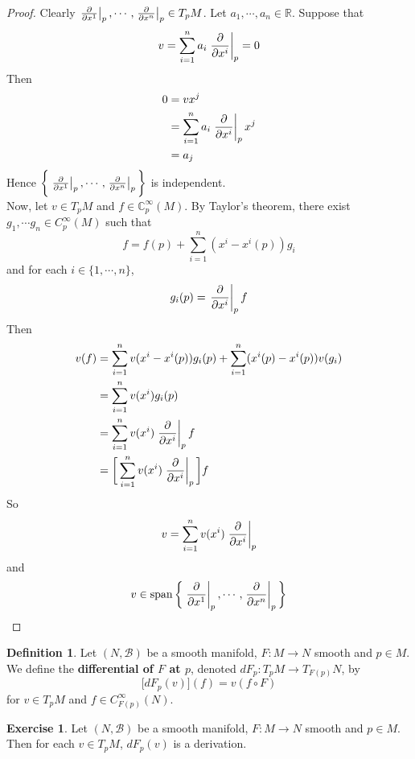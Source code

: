 \documentclass[12pt]{amsart}
\theoremstyle{definition}
\newtheorem{defn}[definition]{Definition}
\newtheorem{ex}[definition]{Exercise}
\newcommand{\C}{\mathbb{C}}
\newcommand{\R}{\mathbb{R}}
\newcommand{\MB}{\mathcal{B}}
\DeclareMathOperator{\spn}{span}
\begin{document}
	\begin{proof}
		Clearly $\eval{\pdv{x^1}}_{p}, \cdots, \eval{\pdv{x^n}}_{p} \in T_pM$. Let $a_1, \cdots, a_n \in \R$. Suppose that $$v = \sum_{i=1}^n a_i \eval{\pdv{x^i}}_{p} = 0$$
		Then 
		\begin{align*}
			0
			&= v x^j \\
			&= \sum_{i=1}^n a_i \eval{\pdv{x^i}}_{p} x^j \\
			&= a_j
		\end{align*}
		Hence $\bigg \{\eval{\pdv{x^1}}_{p}, \cdots, \eval{\pdv{x^n}}_{p} \bigg \}$ is independent.\\
		Now, let $v \in T_pM$ and $f \in \C^{\infty}_p(M)$. By Taylor's theorem, there exist $g_1, \cdots g_n \in C_p^{\infty}(M)$ such that $$f = f(p) + \sum_{i=1}^n(x^i - x^i(p)) g_i$$ and for each $i \in \{1, \cdots, n\}$, $$g_i(p) = \eval{\pdv{x^i}}_{p} f $$ Then 
		\begin{align*}
			v(f)
			&= \sum_{i=1}^nv(x^i - x^i(p)) g_i(p) + \sum_{i=1}^n(x^i(p) - x^i(p)) v(g_i) \\
			&= \sum_{i=1}^nv(x^i)g_i(p) \\
			&= \sum_{i=1}^nv(x^i)\eval{\pdv{x^i}}_{p} f \\
			&= \bigg[ \sum_{i=1}^nv(x^i)\eval{\pdv{x^i}}_{p} \bigg] f
		\end{align*}
		So $$v = \sum_{i=1}^nv(x^i)\eval{\pdv{x^i}}_{p} $$ and $$v \in \spn \bigg \{\eval{\pdv{x^1}}_{p}, \cdots, \eval{\pdv{x^n}}_{p} \bigg \}$$
	\end{proof}



	\begin{defn}
		Let $(N, \MB)$ be a smooth manifold, $F: M \rightarrow N$ smooth and $p \in M$. We define the \textbf{differential of $F$ at $p$}, denoted $dF_p: T_pM \rightarrow T_{F(p)}N$, by $$\bigg[ dF_p(v) \bigg] (f) = v (f \circ F)$$  for $v \in T_pM$ and $f \in C^{\infty}_{F(p)}(N)$.
	\end{defn}
	
	
	
	\begin{ex}
	Let $(N, \MB)$ be a smooth manifold, $F: M \rightarrow N$ smooth and $p \in M$. Then for each $v \in T_pM$, $dF_p(v)$ is a derivation.
	\end{ex}
	
\end{document}
